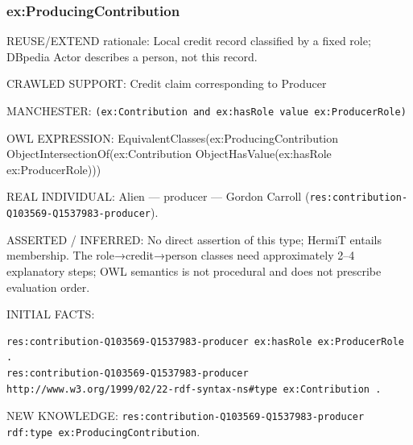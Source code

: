 \documentclass[
  11pt,
]{article}
\begin{document}
\subsubsection{\texorpdfstring{ex:\allowbreak{}\allowbreak{}Produ\allowbreak{}cing\allowbreak{}Cont\allowbreak{}ribution\allowbreak{}}{}}\label{exproducingcontribution}

REUSE/EXTEND rationale: Local credit record classified by a fixed role;
DBpedia Actor describes a person, not this record.

CRAWLED SUPPORT: Credit claim correspo\allowbreak{}nding to Producer

MANCHESTER:
\texttt{(ex:\allowbreak{}\allowbreak{}Cont\allowbreak{}ribution\allowbreak{} and ex:\allowbreak{}has\allowbreak{}Role \allowbreak{}value ex\allowbreak{}:\allowbreak{}\allowbreak{}Produce\allowbreak{}r\allowbreak{}Role)}

OWL EXPRESSION:
Equivale\allowbreak{}nt\allowbreak{}Classe\allowbreak{}s(ex:\allowbreak{}\allowbreak{}Pro\allowbreak{}ducing\allowbreak{}Co\allowbreak{}ntributi\allowbreak{}on
Object\allowbreak{}In\allowbreak{}tersecti\allowbreak{}on\allowbreak{}Of(ex:\allowbreak{}\allowbreak{}Contribu\allowbreak{}tion
Object\allowbreak{}Ha\allowbreak{}s\allowbreak{}Value(e\allowbreak{}x:\allowbreak{}has\allowbreak{}Rol\allowbreak{}e
ex:\allowbreak{}\allowbreak{}Produ\allowbreak{}cer\allowbreak{}Role)\allowbreak{}))

REAL INDIVIDUAL: Alien --- producer --- Gordon Carroll
(\texttt{res:\allowbreak{}cont\allowbreak{}ribution\allowbreak{}-\allowbreak{}\allowbreak{}Q103569\allowbreak{}-\allowbreak{}\allowbreak{}Q153798\allowbreak{}3-\allowbreak{}produc\allowbreak{}er}).

ASSERTED / INFERRED: No direct assertion of this type; HermiT entails
membership. The role→credit→person classes need
approxim\allowbreak{}ately 2--4 explanatory steps; OWL semantics is not
procedural and does not prescribe evaluation order.

INITIAL FACTS:

\begin{verbatim}
res:contribution-Q103569-Q1537983-producer ex:hasRole ex:ProducerRole .
res:contribution-Q103569-Q1537983-producer http://www.w3.org/1999/02/22-rdf-syntax-ns#type ex:Contribution .
\end{verbatim}

NEW KNOWLEDGE:
\texttt{res:\allowbreak{}cont\allowbreak{}ribution\allowbreak{}-\allowbreak{}\allowbreak{}Q103569\allowbreak{}-\allowbreak{}\allowbreak{}Q153798\allowbreak{}3-\allowbreak{}produc\allowbreak{}er rdf:\allowbreak{}t\allowbreak{}ype ex:\allowbreak{}\allowbreak{}P\allowbreak{}roducing\allowbreak{}\allowbreak{}Contribu\allowbreak{}tion}.
\end{document}
